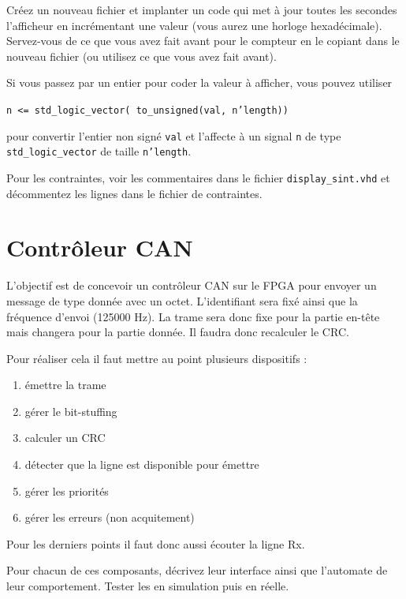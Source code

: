 \documentclass[11pt]{paper}
\begin{document}
Créez un nouveau fichier et implanter un code qui met à jour toutes les secondes l'afficheur en incrémentant une valeur (vous aurez une horloge hexadécimale). Servez-vous de ce que vous avez fait avant pour le compteur en le copiant dans le nouveau fichier (ou utilisez ce que vous avez fait avant).

Si vous passez par un entier pour coder la valeur à afficher, vous pouvez utiliser

{\tt n <= std\_logic\_vector( to\_unsigned(val, n'length))} 

pour convertir l'entier non signé {\tt val} et l'affecte à un signal {\tt n} de type {\tt std\_logic\_vector} de taille {\tt n'length}.

Pour les contraintes, voir les commentaires dans le fichier {\tt display\_sint.vhd} et décommentez les lignes dans le fichier de contraintes.


  \section{Contrôleur CAN}

L'objectif est de concevoir un contrôleur CAN sur le FPGA pour envoyer un message de type donnée avec un octet. L'identifiant sera fixé ainsi que la fréquence d'envoi (125000 Hz). La trame sera donc fixe pour la partie en-tête mais changera pour la partie donnée. Il faudra donc recalculer le CRC.

Pour réaliser cela il faut mettre au point plusieurs dispositifs :
\begin{enumerate}
	\item émettre la trame
	\item gérer le bit-stuffing
	\item calculer un CRC
	\item détecter que la ligne est disponible pour émettre
	\item gérer les priorités
	\item gérer les erreurs (non acquitement)
\end{enumerate}

Pour les derniers points il faut donc aussi écouter la ligne Rx.

Pour chacun de ces composants, décrivez leur interface ainsi que l'automate de leur comportement. Tester les en simulation puis en réelle.
\end{document}
